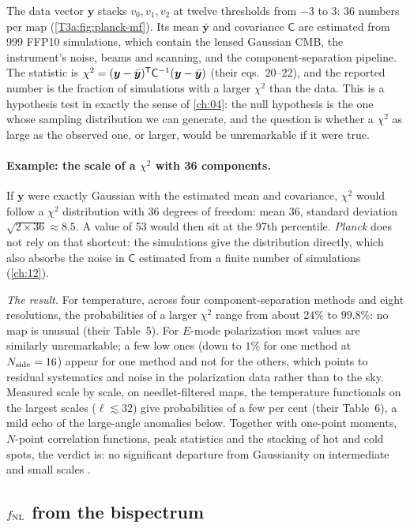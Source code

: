 The data vector $\bm y$ stacks $v_0,v_1,v_2$ at twelve thresholds from $-3$ to $3$: 36 numbers per map (\cref{T3a:fig:planck-mf}). Its mean $\bar{\bm y}$ and covariance $\mathsf C$ are estimated from 999 FFP10 simulations, which contain the lensed Gaussian CMB, the instrument's noise, beams and scanning, and the component-separation pipeline. The statistic is $\chi^2=(\bm y-\bar{\bm y})^{\mathsf{T}}\mathsf C^{-1}(\bm y-\bar{\bm y})$ (their eqs.~20--22), and the reported number is the fraction of simulations with a larger $\chi^2$ than the data. This is a hypothesis test in exactly the sense of \cref{ch:04}: the null hypothesis is the one whose sampling distribution we can generate, and the question is whether a $\chi^2$ as large as the observed one, or larger, would be unremarkable if it were true.

\paragraph{Example: the scale of a $\chi^2$ with 36 components.} If $\bm y$ were exactly Gaussian with the estimated mean and covariance, $\chi^2$ would follow a $\chi^2$ distribution with 36 degrees of freedom: mean 36, standard deviation $\sqrt{2\times36}\approx8.5$. A value of 53 would then sit at the 97th percentile. \textit{Planck} does not rely on that shortcut: the simulations give the distribution directly, which also absorbs the noise in $\mathsf C$ estimated from a finite number of simulations (\cref{ch:12}).

\emph{The result.} For temperature, across four component-separation methods and eight resolutions, the probabilities of a larger $\chi^2$ range from about $24\%$ to $99.8\%$: no map is unusual (their Table~5). For $E$-mode polarization most values are similarly unremarkable; a few low ones (down to $1\%$ for one method at $N_{\rm side}=16$) appear for one method and not for the others, which points to residual systematics and noise in the polarization data rather than to the sky. Measured scale by scale, on needlet-filtered maps, the temperature functionals on the largest scales ($\ell\lesssim32$) give probabilities of a few per cent (their Table~6), a mild echo of the large-angle anomalies below. Together with one-point moments, $N$-point correlation functions, peak statistics and the stacking of hot and cold spots, the verdict is: no significant departure from Gaussianity on intermediate and small scales \cite{Planck2018VII}.

\subsection{$f_{\rm NL}$ from the bispectrum}
\label{T3a:sec:planck-fnl}

